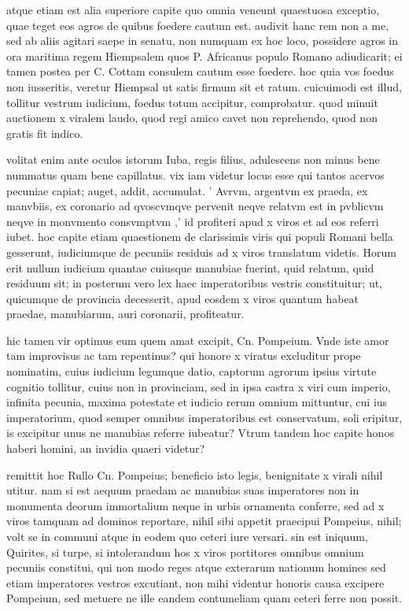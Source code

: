  atque etiam est alia superiore capite quo omnia veneunt quaestuosa exceptio, quae teget eos agros de quibus foedere cautum est. audivit hanc rem non a me, sed ab aliis agitari saepe in senatu, non numquam ex hoc loco, possidere agros in ora maritima regem Hiempsalem quos P. Africanus populo Romano adiudicarit; ei tamen postea per C. Cottam consulem cautum esse foedere. hoc quia vos foedus non iusseritis, veretur Hiempsal ut satis firmum sit et ratum. cuicuimodi est illud, tollitur vestrum iudicium, foedus totum accipitur, comprobatur. quod minuit auctionem x viralem laudo, quod regi amico cavet non reprehendo, quod non gratis fit indico.

 volitat enim ante oculos istorum Iuba, regis filius, adulescens non minus bene nummatus quam bene capillatus. vix iam videtur locus esse qui tantos acervos pecuniae capiat; auget, addit, accumulat. ' Avrvm, argentvm ex praeda, ex manvbiis, ex coronario ad qvoscvmqve pervenit neqve relatvm est in pvblicvm neqve in monvmento consvmptvm ,' id profiteri apud x viros et ad eos referri iubet. hoc capite etiam quaestionem de clarissimis viris qui populi Romani bella gesserunt, iudiciumque de pecuniis residuis ad x viros translatum videtis. Horum erit nullum iudicium quantae cuiusque manubiae fuerint, quid relatum, quid residuum sit; in posterum vero lex haec imperatoribus vestris constituitur; ut, quicumque de provincia decesserit, apud eosdem x viros quantum habeat praedae, manubiarum, auri coronarii, profiteatur.

 hic tamen vir optimus eum quem amat excipit, Cn. Pompeium. Vnde iste amor tam improvisus ac tam repentinus? qui honore x viratus excluditur prope nominatim, cuius iudicium legumque datio, captorum agrorum ipsius virtute cognitio tollitur, cuius non in provinciam, sed in ipsa castra x viri cum imperio, infinita pecunia, maxima potestate et iudicio rerum omnium mittuntur, cui ius imperatorium, quod semper omnibus imperatoribus est conservatum, soli eripitur, is excipitur unus ne manubias referre iubeatur? Vtrum tandem hoc capite honos haberi homini, an invidia quaeri videtur?

 remittit hoc Rullo Cn. Pompeius; beneficio isto legis, benignitate x virali nihil utitur. nam si est aequum praedam ac manubias suas imperatores non in monumenta deorum immortalium neque in urbis ornamenta conferre, sed ad x viros tamquam ad dominos reportare, nihil sibi appetit praecipui Pompeius, nihil; volt se in communi atque in eodem quo ceteri iure versari. sin est iniquum, Quirites, si turpe, si intolerandum hos x viros portitores omnibus omnium pecuniis constitui, qui non modo reges atque exterarum nationum homines sed etiam imperatores vestros excutiant, non mihi videntur honoris causa excipere Pompeium, sed metuere ne ille eandem contumeliam quam ceteri ferre non possit.

